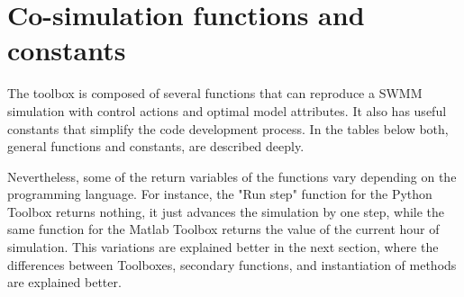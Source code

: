 \documentclass[11pt, letterpaper]{article}
\begin{document}
\section{Co-simulation functions and constants}

The toolbox is composed of several functions that can reproduce a SWMM simulation with control actions and optimal model attributes. It also has useful constants that simplify the code development process. In the tables below both, general functions and constants, are described deeply.

Nevertheless, some of the return variables of the functions vary depending on the programming language. For instance, the "Run step" function for the Python Toolbox returns nothing, it just advances the simulation by one step, while the same function for the Matlab Toolbox returns the value of the current hour of simulation. This variations are explained better in the next section, where the differences between Toolboxes, secondary functions, and instantiation of methods are explained better.
\end{document}
